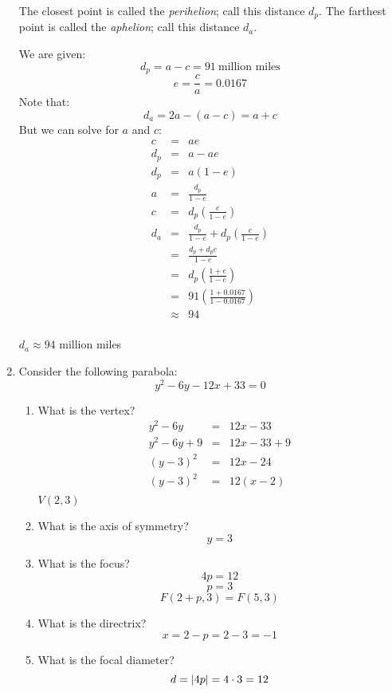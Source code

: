\documentclass[letterpaper,12pt,fleqn]{article}
\begin{document}
\begin{enumerate}
  The closest point is called the \emph{perihelion}; call this distance $d_p$.
  The farthest point is called the \emph{aphelion}; call this distance $d_a$.
  
  We are given:
  \[d_p=a-c=91\ \mbox{million miles}\]
  \[e=\frac{c}{a}=0.0167\]
  Note that:
  \[d_a=2a-(a-c)=a+c\]
  But we can solve for $a$ and $c$:
  \begin{eqnarray*}
    c &=& ae \\
    d_p &=& a-ae \\
    d_p &=& a(1-e) \\
    a &=& \frac{d_p}{1-e} \\
    c &=& d_p\left(\frac{e}{1-e}\right) \\
    d_a &=& \frac{d_p}{1-e}+d_p\left(\frac{e}{1-e}\right) \\
    &=& \frac{d_p+d_pe}{1-e} \\
    &=& d_p\left(\frac{1+e}{1-e}\right) \\    
    &=& 91\left(\frac{1+0.0167}{1-0.0167}\right) \\
    &\approx& 94 \\
  \end{eqnarray*}

  $d_a\approx94$ million miles

  \bigskip

\item Consider the following parabola:
  \[y^2-6y-12x+33=0\]
  \begin{enumerate}
  \item What is the vertex?
    \begin{eqnarray*}
      y^2-6y &=& 12x-33 \\
      y^2-6y+9 &=& 12x-33+9 \\
      (y-3)^2 &=& 12x-24 \\
      (y-3)^2 &=& 12(x-2) \\
    \end{eqnarray*}
    $V(2,3)$
    
  \item What is the axis of symmetry?
    \[y=3\]
    
  \item What is the focus?
    \[4p=12\]
    \[p=3\]
    \[F(2+p,3)=F(5,3)\]
    
  \item What is the directrix?
    \[x=2-p=2-3=-1\]
    
  \item What is the focal diameter?
    \[d=\lvert4p\rvert=4\cdot3=12\]
    

\end{enumerate}
\end{enumerate}
\end{document}
